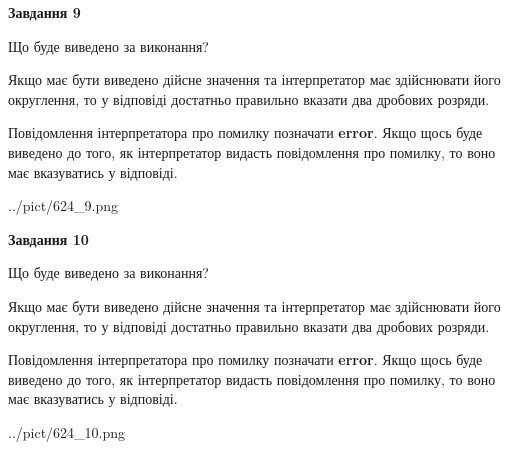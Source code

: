 \documentclass[12pt, ukrainian]{article}
\begin{document}
{\begin {Large}
{\begin {center}\textbf{Завдання 9}\end {center}}\par
Що буде виведено за виконання? \par

Якщо має бути виведено дійсне значення та інтерпретатор має здійснювати його округлення, 
то у відповіді достатньо правильно вказати два дробових розряди.

Повідомлення інтерпретатора про помилку позначати \textbf{error}.
Якщо щось буде виведено до того, як інтерпретатор видасть повідомлення про помилку, 
то воно має вказуватись у відповіді. \par

\begin{center}
	{../pict/624_9.png}
\end{center}
\newpage

{\begin {center}\textbf{Завдання 10}\end {center}}\par
Що буде виведено за виконання? \par

Якщо має бути виведено дійсне значення та інтерпретатор має здійснювати його округлення, 
то у відповіді достатньо правильно вказати два дробових розряди.

Повідомлення інтерпретатора про помилку позначати \textbf{error}.
Якщо щось буде виведено до того, як інтерпретатор видасть повідомлення про помилку, 
то воно має вказуватись у відповіді. \par

\begin{center}
	{../pict/624_10.png}
\end{center}
\newpage

\end {Large}}
\end{document}

